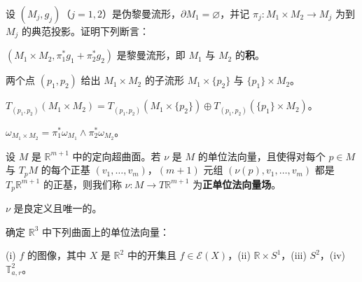 \begin{exercises}
\item

设 $ (M_{j}, g_{j}) $（$ j = 1, 2 $）是伪黎曼流形，$ \partial M_{1} = \varnothing $，并记 $ \pi_{j} : M_{1} \times M_{2} \to M_{j} $ 为到 $ M_{j} $ 的典范投影。证明下列断言：

\begin{subitems}
\item

$ (M_{1} \times M_{2}, \pi_{1}^{\ast} g_{1} + \pi_{2}^{\ast} g_{2}) $ 是黎曼流形，即 $ M_{1} $ 与 $ M_{2} $ 的\textbf{积}。

\item

两个点 $ (p_{1}, p_{2}) $ 给出 $ M_{1} \times M_{2} $ 的子流形 $ M_{1} \times \{p_{2}\} $ 与 $ \{p_{1}\} \times M_{2} $。

\item

$ T_{(p_{1},p_{2})}(M_{1} \times M_{2}) = T_{(p_{1},p_{2})}(M_{1} \times \{p_{2}\}) \oplus T_{(p_{1},p_{2})}(\{p_{1}\} \times M_{2}) $。

\item

$ \omega_{M_{1} \times M_{2}} = \pi_{1}^{\ast}\omega_{M_{1}} \wedge \pi_{2}^{\ast}\omega_{M_{2}} $。

\end{subitems}

\item

设 $ M $ 是 $ \mathbb{R}^{m+1} $ 中的定向超曲面。若 $ \nu $ 是 $ M $ 的单位法向量，且使得对每个 $ p \in M $ 与 $ T_{p}M $ 的每个正基 $ (v_{1}, \ldots, v_{m}) $，$ (m+1) $ 元组 $ (\nu(p), v_{1}, \ldots, v_{m}) $ 都是 $ T_{p}\mathbb{R}^{m+1} $ 的正基，则我们称 $ \nu : M \to T\mathbb{R}^{m+1} $ 为\textbf{正单位法向量场}。

\begin{items}
\item

\proofhead
$ \nu $ 是良定义且唯一的。
\item

确定 $ \mathbb{R}^{3} $ 中下列曲面上的单位法向量：

\end{items}

(i) $ f $ 的图像，其中 $ X $ 是 $ \mathbb{R}^{2} $ 中的开集且 $ f \in \mathcal{E}(X) $，(ii) $ \mathbb{R} \times S^{1} $，(iii) $ S^{2} $，(iv) $ \mathbb{T}^{2}_{a,r} $。


\end{exercises}
